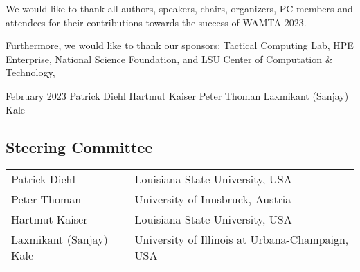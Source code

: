 \documentclass{llncs}
\begin{document}
We would like to thank all authors, speakers, chairs, organizers, PC members and attendees for their contributions towards the success of WAMTA 2023.

Furthermore, we would like to thank our sponsors: Tactical Computing Lab, HPE Enterprise, National Science Foundation, and LSU Center of Computation \& Technology,

\vspace{3em}
\noindent February 2023
\newline \hspace*{\fill} Patrick Diehl
\newline \hspace*{\fill} Hartmut Kaiser
\newline \hspace*{\fill} Peter Thoman
\newline \hspace*{\fill} Laxmikant (Sanjay) Kale

\subsection*{Steering Committee}
\begin{tabular}{@{}p{5cm}@{}p{7.2cm}@{}}
Patrick Diehl & Louisiana State University, USA\\
Peter Thoman & University of Innsbruck, Austria\\
Hartmut Kaiser & Louisiana State University, USA\\
Laxmikant (Sanjay) Kale & University of Illinois at Urbana-Champaign, USA\\
\end{tabular}
\end{document}
